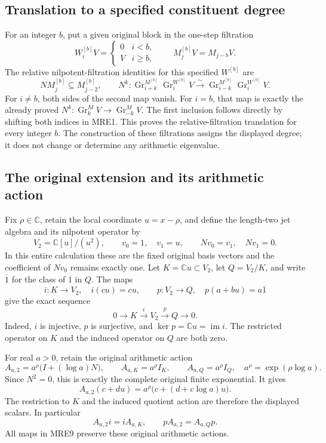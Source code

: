 \documentclass[11pt,a4paper]{article}
\begin{document}
\subsection{Translation to a specified constituent degree}

For an integer \(b\), put a given original block in the one-step filtration
\[
 W_i^{[b]}V=
 \begin{cases}0&i<b,\\ V&i\geq b,\end{cases}
 \qquad
 M_j^{[b]}V=M_{j-b}V.
 \tag{MRE5}
\]
The relative nilpotent-filtration identities for this specified \(W^{[b]}\)
are
\[
 NM_j^{[b]}\subseteq M_{j-2}^{[b]},\qquad
 N^k:\operatorname{Gr}_{i+k}^{M^{[b]}}
             \operatorname{Gr}_i^{W^{[b]}}V
 \xrightarrow{\sim}
       \operatorname{Gr}_{i-k}^{M^{[b]}}
             \operatorname{Gr}_i^{W^{[b]}}V.
 \tag{MRE6}
\]
For \(i\ne b\), both sides of the second map vanish. For \(i=b\), that
map is exactly the already proved
\(N^k:\operatorname{Gr}_k^M V\to\operatorname{Gr}_{-k}^M V\).
The first inclusion follows directly by shifting both indices in MRE1.
This proves the relative-filtration translation for every integer \(b\).
The construction of these filtrations assigns the displayed degree; it
does not change or determine any arithmetic eigenvalue.

\subsection{The original extension and its arithmetic action}

Fix \(\rho\in\mathbb C\), retain the local coordinate \(u=x-\rho\), and
define the length-two jet algebra and its nilpotent operator by
\[
 V_2=\mathbb C[u]/(u^2),\qquad
 v_0=1,\quad v_1=u,\qquad
 Nv_0=v_1,\quad Nv_1=0.
 \tag{MRE7}
\]
In this entire calculation these are the fixed original basis vectors
and the coefficient of \(Nv_0\) remains exactly one.
Let \(K=\mathbb C u\subset V_2\), let \(Q=V_2/K\), and write
\(\overline{1}\) for the class of \(1\) in \(Q\). The maps
\[
 i:K\longrightarrow V_2,\quad i(cu)=cu,
 \qquad
 p:V_2\longrightarrow Q,\quad p(a+bu)=a\overline{1}
 \tag{MRE8}
\]
give the exact sequence
\[
 0\longrightarrow K\xrightarrow{i}V_2\xrightarrow{p}Q
   \longrightarrow0.
 \tag{MRE9}
\]
Indeed, \(i\) is injective, \(p\) is surjective, and
\(\ker p=\mathbb C u=\operatorname{im}i\). The restricted operator on
\(K\) and the induced operator on \(Q\) are both zero.

For real \(a>0\), retain the original arithmetic action
\[
 A_{a,2}=a^\rho\bigl(I+(\log a)N\bigr),\qquad
 A_{a,K}=a^\rho I_K,\qquad A_{a,Q}=a^\rho I_Q,
 \quad a^\rho=\exp(\rho\log a).
 \tag{MRE10}
\]
Since \(N^2=0\), this is exactly the complete original finite exponential.
It gives
\[
 A_{a,2}(c+du)=a^\rho\bigl(c+(d+c\log a)u\bigr).
 \tag{MRE11}
\]
The restriction to \(K\) and the induced quotient action are therefore
the displayed scalars. In particular
\[
 A_{a,2}i=iA_{a,K},\qquad pA_{a,2}=A_{a,Q}p.
 \tag{MRE12}
\]
All maps in MRE9 preserve these original arithmetic actions.
\end{document}
